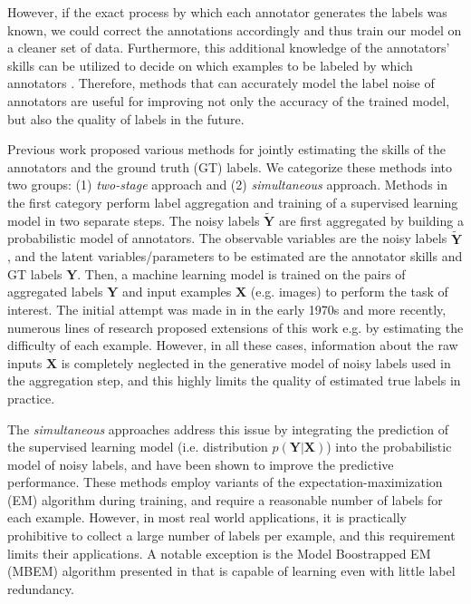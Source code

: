 However, if the exact process by which each annotator generates the labels was known, we could correct the annotations accordingly and thus train our model on a cleaner set of data. Furthermore, this additional knowledge of the annotators' skills can be utilized to decide on which examples to be labeled by which annotators \cite{welinder2010online,long2013active,long2015multi}. Therefore, methods that can accurately model the label noise of annotators are useful for improving not only the accuracy of the trained model, but also the quality of labels in the future. 

Previous work proposed various methods for jointly estimating the skills of the annotators and the ground truth (GT) labels. We categorize these methods into two groups: (1) \textit{two-stage} approach and (2) \textit{simultaneous} approach. Methods in the first category perform label aggregation and training of a supervised learning model in two separate steps. The noisy labels $\widetilde{\mathbf{Y}}$ are first aggregated by building a probabilistic model of annotators. The observable variables are the noisy labels $\widetilde{\mathbf{Y}}$, and the latent variables/parameters to be estimated are the annotator skills and GT labels $\mathbf{Y}$. Then, a machine learning model is trained on the pairs of aggregated labels $\mathbf{Y}$ and input examples $\mathbf{X}$ (e.g. images) to perform the task of interest. The initial attempt was made in \cite{dawid1979maximum} in the early 1970s and more recently, numerous lines of research \cite{smyth1995inferring,warfield2004simultaneous,whitehill2009whose,welinder2010multidimensional,rodrigues2013learning} proposed extensions of this work e.g. by estimating the difficulty of each example. However, in all these cases, information about the raw inputs $\mathbf{X}$ is completely neglected in the generative model of noisy labels used in the aggregation step, and this highly limits the quality of estimated true labels in practice.

The \textit{simultaneous} approaches \cite{raykar2009supervised,yan2010modeling,branson2017lean,van2018lean} address this issue by integrating the prediction of the supervised learning model (i.e. distribution $p(\mathbf{Y}|\mathbf{X})$) into the probabilistic model of noisy labels, and have been shown to improve the predictive performance. These methods employ variants of the expectation-maximization (EM) algorithm during training, and require a reasonable number of labels for each example. However, in most real world applications, it is practically prohibitive to collect a large number of labels per example, and this requirement limits their applications. A notable exception is the Model Boostrapped EM (MBEM) algorithm presented in \cite{khetan2017learning} that is capable of learning even with little label redundancy. 



